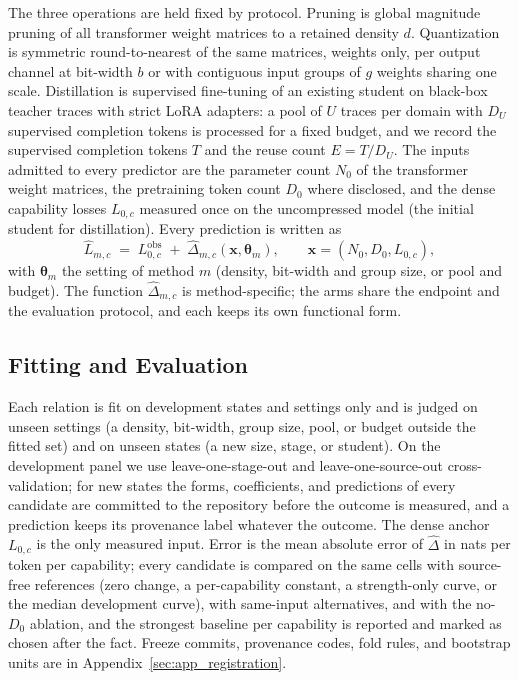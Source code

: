 The three operations are held fixed by protocol. Pruning is global
magnitude pruning of all transformer weight matrices to a retained
density $d$. Quantization is symmetric round-to-nearest of the same
matrices, weights only, per output channel at bit-width $b$ or with
contiguous input groups of $g$ weights sharing one scale.
Distillation is supervised fine-tuning of an existing student on
black-box teacher traces with strict LoRA adapters: a pool of $U$
traces per domain with $D_U$ supervised completion tokens is processed
for a fixed budget, and we record the supervised completion tokens $T$
and the reuse count $E=T/D_U$. The inputs admitted to every predictor
are the parameter count $N_0$ of the transformer weight matrices, the
pretraining token count $D_0$ where disclosed, and the dense capability
losses $L_{0,c}$ measured once on the uncompressed model (the initial
student for distillation). Every prediction is written as
\begin{equation}
\widehat L_{m,c}\;=\;L^{\mathrm{obs}}_{0,c}\;+\;
\widehat\Delta_{m,c}(\mathbf x,\boldsymbol\theta_m),\qquad
\mathbf x=(N_0,D_0,L_{0,c}),
\label{eq:interface}
\end{equation}
with $\boldsymbol\theta_m$ the setting of method $m$ (density,
bit-width and group size, or pool and budget). The function
$\widehat\Delta_{m,c}$ is method-specific; the arms share the endpoint
and the evaluation protocol, and each keeps its own functional form.

\subsection{Fitting and Evaluation}
\label{sec:eval}

Each relation is fit on development states and settings only and is
judged on unseen settings (a density, bit-width, group size, pool, or
budget outside the fitted set) and on unseen states (a new size,
stage, or student). On the development panel we use
leave-one-stage-out and leave-one-source-out cross-validation; for new
states the forms, coefficients, and predictions of every candidate are
committed to the repository before the outcome is measured, and a
prediction keeps its provenance label whatever the outcome. The dense
anchor $L_{0,c}$ is the only measured input. Error is the mean
absolute error of $\widehat\Delta$ in nats per token per capability;
every candidate is compared on the same cells with source-free
references (zero change, a per-capability constant, a strength-only
curve, or the median development curve), with same-input alternatives,
and with the no-$D_0$ ablation, and the strongest baseline per
capability is reported and marked as chosen after the fact. Freeze
commits, provenance codes, fold rules, and bootstrap units are in
Appendix~\ref{sec:app_registration}.
